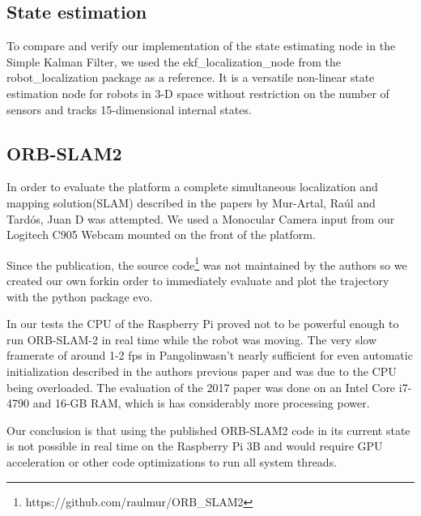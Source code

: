 \documentclass[class=article, crop=false]{standalone}
\begin{document}
\subsection{State estimation}\label{subsec:state-est}

To compare and verify our implementation of the state estimating node in the Simple Kalman Filter, we used the ekf\_localization\_node from the  robot\_localization\cite{MooreStouchKeneralizedEkf2014} package as a reference.
It is a versatile non-linear state estimation node for robots in 3-D space without restriction on the number of sensors and tracks 15-dimensional internal states.

\subsection{ORB-SLAM2}\label{subsec:orbslam2}

In order to evaluate the platform a complete simultaneous localization and mapping solution(SLAM) described in the papers\cite{mur2017orb}\cite{mur2015orb} by Mur-Artal, Ra\'ul and Tard{\'o}s, Juan D was attempted. We used a Monocular Camera input from our Logitech C905 Webcam mounted on the front of the platform.

Since the publication, the source code\footnote{https://github.com/raulmur/ORB\_SLAM2} was not maintained by the authors so we created our own fork\footnotemark in order to immediately evaluate and plot the trajectory with the python package evo\cite{grupp2017evo}.


In our tests the CPU of the Raspberry Pi proved not to be powerful enough to run ORB-SLAM-2 in real time while the robot was moving. The very slow framerate of around 1-2 fps in Pangolin\footnotemark wasn't nearly sufficient for even automatic initialization described in the authors previous paper\cite{mur2015orb} and was due to the CPU being overloaded. The evaluation of the 2017 paper\cite{mur2017orb} was done on an Intel Core i7-4790 and 16-GB RAM, which is has considerably more processing power.


Our conclusion is that using the published ORB-SLAM2 code in its current state is not possible in real time on the Raspberry Pi 3B and would require GPU acceleration or other code optimizations to run all system threads.
\end{document}
